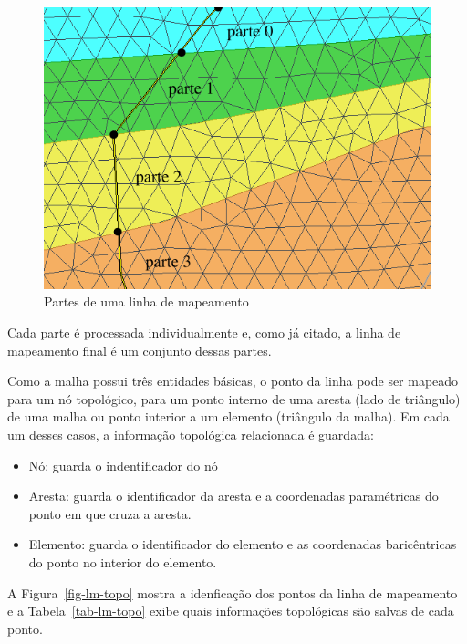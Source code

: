 \begin{figure} [h]
  \begin{center}
    \includegraphics[width=350pt]{images/fig-lm-parts}
    \caption{Partes de uma linha de mapeamento}\label{fig-linemap-parts}
  \end{center}
\end{figure}

Cada parte é processada individualmente e, como já citado, a linha de mapeamento final é um conjunto dessas partes.

Como a malha possui três entidades básicas, o ponto da linha pode ser mapeado para um nó topológico, para um ponto interno de uma aresta (lado de triângulo) de uma malha ou ponto interior a um elemento (triângulo da malha). Em cada um desses casos, a informação topológica relacionada é guardada:

\renewcommand{\labelitemi}{•}
\begin{itemize}
  \item Nó: guarda o indentificador do nó
  \item Aresta: guarda o identificador da aresta e a coordenadas paramétricas do ponto em que cruza a aresta.
  \item Elemento: guarda o identificador do elemento e as coordenadas baricêntricas do ponto no interior do elemento.
\end{itemize}

A Figura~\ref{fig-lm-topo} mostra a idenficação dos pontos da linha de mapeamento e a Tabela~\ref{tab-lm-topo} exibe quais informações topológicas são salvas de cada ponto.

